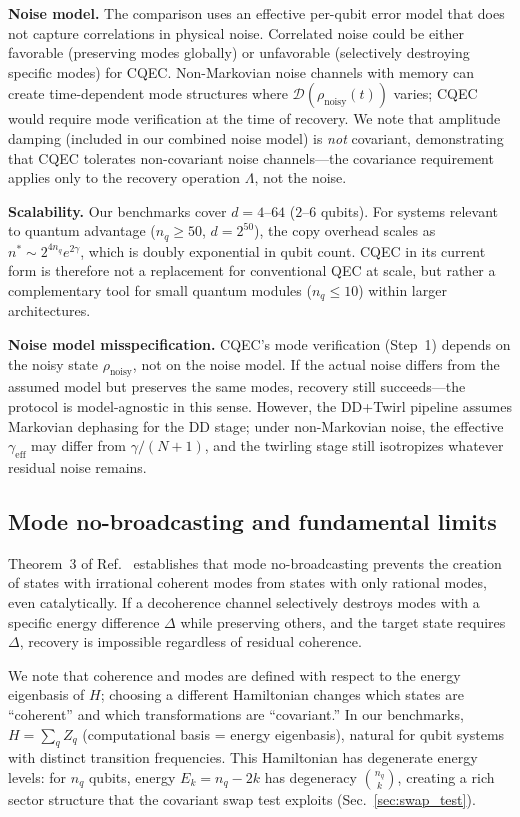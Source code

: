 \documentclass[a4paper,twocolumn]{quantumarticle}
\begin{document}
\textbf{Noise model.}
The comparison uses an effective per-qubit error model that does not capture correlations in physical noise.
Correlated noise could be either favorable (preserving modes globally) or unfavorable (selectively destroying specific modes) for CQEC.
Non-Markovian noise channels with memory can create time-dependent mode structures where $\mathcal{D}(\rho_\mathrm{noisy}(t))$ varies; CQEC would require mode verification at the time of recovery.
We note that amplitude damping (included in our combined noise model) is \emph{not} covariant, demonstrating that CQEC tolerates non-covariant noise channels---the covariance requirement applies only to the recovery operation $\Lambda$, not the noise.

\textbf{Scalability.}
Our benchmarks cover $d = 4$--$64$ ($2$--$6$ qubits).
For systems relevant to quantum advantage ($n_q \geq 50$, $d = 2^{50}$), the copy overhead scales as $n^* \sim 2^{4n_q} e^{2\gamma}$, which is doubly exponential in qubit count.
CQEC in its current form is therefore not a replacement for conventional QEC at scale, but rather a complementary tool for small quantum modules ($n_q \leq 10$) within larger architectures.

\textbf{Noise model misspecification.}
CQEC's mode verification (Step~1) depends on the noisy state $\rho_\mathrm{noisy}$, not on the noise model.
If the actual noise differs from the assumed model but preserves the same modes, recovery still succeeds---the protocol is model-agnostic in this sense.
However, the DD+Twirl pipeline assumes Markovian dephasing for the DD stage; under non-Markovian noise, the effective $\gamma_\mathrm{eff}$ may differ from $\gamma/(N+1)$, and the twirling stage still isotropizes whatever residual noise remains.


\subsection{Mode no-broadcasting and fundamental limits}
\label{sec:no_broadcasting}

Theorem~3 of Ref.~\cite{Shiraishi2024} establishes that mode no-broadcasting prevents the creation of states with irrational coherent modes from states with only rational modes, even catalytically.
If a decoherence channel selectively destroys modes with a specific energy difference $\Delta$ while preserving others, and the target state requires $\Delta$, recovery is impossible regardless of residual coherence.

We note that coherence and modes are defined with respect to the energy eigenbasis of $H$; choosing a different Hamiltonian changes which states are ``coherent'' and which transformations are ``covariant.''
In our benchmarks, $H = \sum_q Z_q$ (computational basis = energy eigenbasis), natural for qubit systems with distinct transition frequencies.
This Hamiltonian has degenerate energy levels: for $n_q$ qubits, energy $E_k = n_q - 2k$ has degeneracy $\binom{n_q}{k}$, creating a rich sector structure that the covariant swap test exploits (Sec.~\ref{sec:swap_test}).
\end{document}
